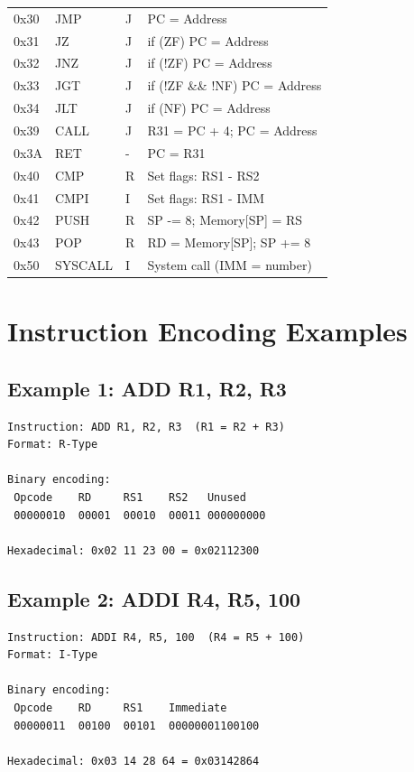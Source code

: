 \documentclass[12pt,a4paper,oneside]{book}
\begin{document}
\begin{table}[H]
\begin{tabularx}{\textwidth}{|l|l|l|X|}
\hline
0x30 & JMP & J & PC = Address \\
0x31 & JZ & J & if (ZF) PC = Address \\
0x32 & JNZ & J & if (!ZF) PC = Address \\
0x33 & JGT & J & if (!ZF \&\& !NF) PC = Address \\
0x34 & JLT & J & if (NF) PC = Address \\
0x39 & CALL & J & R31 = PC + 4; PC = Address \\
0x3A & RET & - & PC = R31 \\
\hline
0x40 & CMP & R & Set flags: RS1 - RS2 \\
0x41 & CMPI & I & Set flags: RS1 - IMM \\
0x42 & PUSH & R & SP -= 8; Memory[SP] = RS \\
0x43 & POP & R & RD = Memory[SP]; SP += 8 \\
\hline
0x50 & SYSCALL & I & System call (IMM = number) \\
\hline
\end{tabularx}
\end{table}

\section{Instruction Encoding Examples}

\subsection{Example 1: ADD R1, R2, R3}

\begin{verbatim}
Instruction: ADD R1, R2, R3  (R1 = R2 + R3)
Format: R-Type

Binary encoding:
 Opcode    RD     RS1    RS2   Unused
 00000010  00001  00010  00011 000000000
 
Hexadecimal: 0x02 11 23 00 = 0x02112300
\end{verbatim}

\subsection{Example 2: ADDI R4, R5, 100}

\begin{verbatim}
Instruction: ADDI R4, R5, 100  (R4 = R5 + 100)
Format: I-Type

Binary encoding:
 Opcode    RD     RS1    Immediate
 00000011  00100  00101  00000001100100
 
Hexadecimal: 0x03 14 28 64 = 0x03142864
\end{verbatim}
\end{document}
